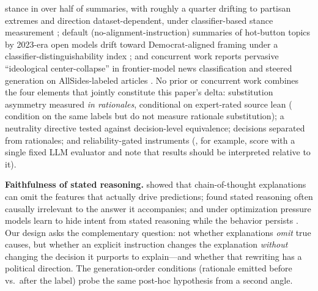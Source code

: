 \documentclass{article}
\begin{document}
stance in over half of summaries, with roughly a quarter drifting to
partisan extremes and direction dataset-dependent, under
classifier-based stance measurement \citep{liu2024p3sum}; default
(no-alignment-instruction) summaries of hot-button topics by 2023-era
open models drift toward Democrat-aligned framing under a
classifier-distinguishability index \citep{vijay2025neutral}; and
concurrent work reports pervasive ``ideological center-collapse'' in
frontier-model news classification and steered generation on
AllSides-labeled articles \citep{kennedy2026left}. No prior or
concurrent work combines the four elements that jointly constitute this
paper's delta: substitution asymmetry measured \emph{in rationales},
conditional on expert-rated source lean (\citealp{kennedy2026left}
condition on the same labels but do not measure rationale substitution);
a neutrality directive tested against decision-level equivalence; decisions separated from rationales; and
reliability-gated instruments (\citealp{kennedy2026left}, for example,
score with a single fixed LLM evaluator and note that results should be
interpreted relative to it).

\textbf{Faithfulness of stated reasoning.} \citet{turpin2023language}
showed that chain-of-thought explanations can omit the features that
actually drive predictions; \citet{lanham2023measuring} found stated
reasoning often causally irrelevant to the answer it accompanies; and
under optimization pressure models learn to hide intent from stated
reasoning while the behavior persists \citep{baker2025obfuscation}. Our design asks the complementary question: not
whether explanations \emph{omit} true causes, but whether an explicit
instruction changes the explanation \emph{without} changing the decision it
purports to explain---and whether that rewriting has a political direction.
The generation-order conditions (rationale emitted before vs.\ after the label)
probe the same post-hoc hypothesis from a second angle.
\end{document}
